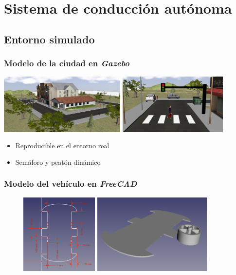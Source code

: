 \documentclass{beamer}
\begin{document}
\section{Sistema de conducción autónoma}
\subsection{Entorno simulado}
\begin{frame}
	\frametitle{Modelo de la ciudad en \textit{Gazebo}}
	\includegraphics[height=3cm]{figs/smallcity}
	\includegraphics[height=3cm]{figs/trafficlightpedestrian}\vspace{1cm}
	\begin{itemize}
		\item Reproducible en el entorno real
		\item Semáforo y peatón dinámico
	\end{itemize}
\end{frame}

\begin{frame}
	\frametitle{Modelo del vehículo en \textit{FreeCAD}}
	\begin{figure}
		\centering
		\includegraphics[height=4cm]{figs/sketchFreecad}\hspace{0.1cm}
		\includegraphics[height=4cm]{figs/freecad}
	\end{figure}
\end{frame}
\end{document}
